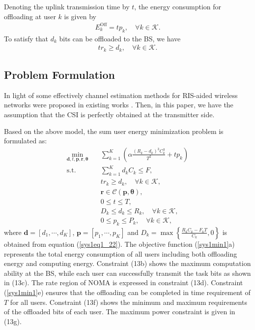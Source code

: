 \documentclass[journal]{IEEEtran}
\begin{document}
Denoting the uplink transmission time by $t$, the energy consumption for offloading at user $k$ is given by
\begin{eqnarray}\label{sys1eq6}
E_{k}^{\text{Off}}= tp_k, \quad \forall k\in\mathcal K.
\end{eqnarray}
To satisfy that $d_k$ bits can be offloaded to the BS, we have
\begin{eqnarray}\label{sys1eq62}
tr_k\geq d_k, \quad \forall k\in\mathcal K.
\end{eqnarray}

\subsection{Problem Formulation}
{In light of some effectively channel estimation methods for RIS-aided wireless networks were proposed in existing works \cite{yuan2020reconfigurable,channelestimationyi,channelestimationzheng, channelestimationwang, wei2020channel}. Then, in this paper, we have the assumption that the CSI is perfectly obtained at the transmitter side.}

 Based on the above model, the sum user energy minimization problem is formulated as:
\begin{subequations}\label{sys1min1}
	\begin{align}
	\mathop{\min}_{\pmb d,t,\pmb p,\pmb r,\pmb \theta}\quad
	&\sum_{k=1}^K (\alpha\frac{(R_{k}-d_{k})^3 C^3_{k}}{T^2}+tp_k)
	\\
	\textrm{s.t.}\quad
	& \sum_{k=1}^K d_{k} C_{k}\leq F,\\
	& tr_k\geq d_k, \quad \forall k\in\mathcal K,\\
	& \pmb r \in \mathcal C(\pmb p,  \pmb \theta),\\
	& 0\leq t \leq T,\\
	&  D_{k} \leq d_{k} \leq R_{k}, \quad \forall k\in\mathcal K,\\
	&  0\leq p_k\leq P_k, \quad \forall k\in\mathcal K,
	\end{align}
\end{subequations}
where $\pmb d=[d_{1},\cdots,d_{K}]$,  $\pmb p=[p_1, \cdots, p_K]$ and $D_{k}=\max\left\{\frac{R_{k} C_{k}-F_{k} T}
{C_{k}},0\right\}$ is obtained from equation (\ref{sys1eq1_22}).
The objective function (\ref{sys1min1}a) represents the total energy consumption of all users including both offloading energy and computing energy. Constraint (13b) shows the maximum computation ability at the BS, while  each user can successfully transmit the task bits as shown in (13c). The rate region of NOMA is expressed in constraint (13d).
Constraint (\ref{sys1min1}e) ensures that the offloading can be completed in time requirement of $T$ for all users. Constraint (13f) shows the minimum and maximum requirements of the offloaded bits of each user. The maximum power constraint is given in (13g).
\end{document}
